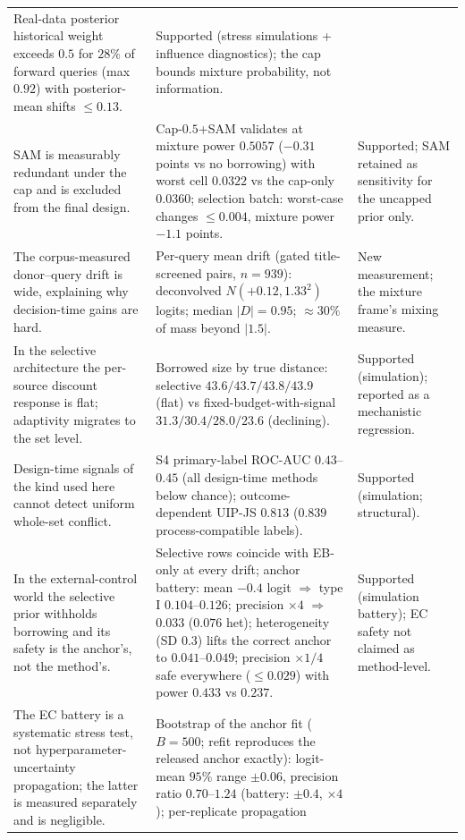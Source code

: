 \documentclass[11pt]{article}
\begin{document}
\begin{longtable}{p{} p{} p{}}
Real-data posterior
historical weight exceeds $0.5$ for $28\%$ of forward queries (max
$0.92$) with posterior-mean shifts $\le 0.13$. & Supported (stress
simulations + influence diagnostics); the cap bounds mixture probability,
not information. \\
SAM is measurably redundant under the cap and is excluded from the final
design. & Cap-$0.5$+SAM validates at mixture power $0.5057$ ($-0.31$
points vs no borrowing) with worst cell $0.0322$ vs the cap-only
$0.0360$; selection batch: worst-case changes $\le 0.004$, mixture power
$-1.1$ points. & Supported; SAM retained as sensitivity for the uncapped
prior only. \\
The corpus-measured donor--query drift is wide, explaining why
decision-time gains are hard. & Per-query mean drift (gated
title-screened pairs, $n=939$): deconvolved $N(+0.12, 1.33^2)$ logits;
median $|D| = 0.95$; $\approx 30\%$ of mass beyond $|1.5|$. & New
measurement; the mixture frame's mixing measure. \\
In the selective architecture the per-source discount response is flat;
adaptivity migrates to the set level. & Borrowed size by true distance:
selective $43.6/43.7/43.8/43.9$ (flat) vs fixed-budget-with-signal
$31.3/30.4/28.0/23.6$ (declining). & Supported (simulation); reported as a
mechanistic regression. \\
Design-time signals of the kind used here cannot detect uniform whole-set
conflict. & S4 primary-label ROC-AUC $0.43$--$0.45$ (all design-time methods
below chance); outcome-dependent UIP-JS $0.813$ ($0.839$ process-compatible
labels). & Supported (simulation; structural). \\
In the external-control world the selective prior withholds borrowing and
its safety is the anchor's, not the method's. & Selective rows coincide with
EB-only at every drift; anchor battery: mean $-0.4$ logit $\Rightarrow$
type I $0.104$--$0.126$; precision $\times4$ $\Rightarrow$ $0.033$
($0.076$ het); heterogeneity (SD $0.3$) lifts the correct anchor to
$0.041$--$0.049$; precision $\times1/4$ safe everywhere ($\le0.029$) with
power $0.433$ vs $0.237$. & Supported (simulation battery); EC safety not
claimed as method-level. \\
The EC battery is a systematic stress test, not hyperparameter-uncertainty
propagation; the latter is measured separately and is negligible. &
Bootstrap of the anchor fit ($B=500$; refit reproduces the released anchor
exactly): logit-mean $95\%$ range $\pm 0.06$, precision ratio
$0.70$--$1.24$ (battery: $\pm 0.4$, $\times 4$); per-replicate propagation

\end{longtable}
\end{document}
